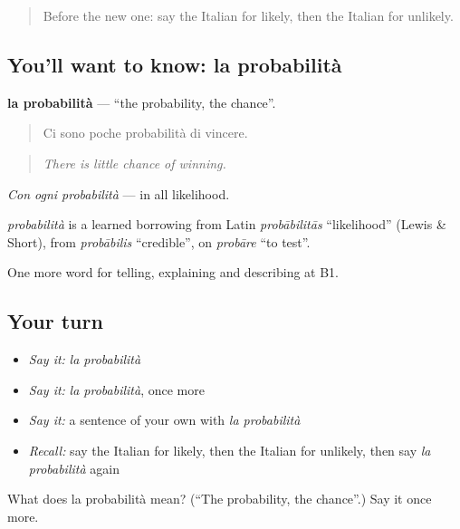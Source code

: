 \label{lesson:IT-C376-probabilita}



\begin{quote}
Before the new one: say the Italian for likely, then the Italian for unlikely.
\end{quote}

\subsection*{You'll want to know: la probabilità}
\textbf{la probabilità} — \textquotedblleft{}the probability, the chance\textquotedblright{}.

\begin{quote}
Ci sono poche probabilità di vincere.
\end{quote}

\begin{quote}
\emph{There is little chance of winning.}
\end{quote}

\emph{Con ogni probabilità} — in all likelihood.

\begin{cousinweb}
\emph{probabilità} is a learned borrowing from Latin \emph{probābilitās} \textquotedblleft{}likelihood\textquotedblright{} (Lewis \& Short), from \emph{probābilis} \textquotedblleft{}credible\textquotedblright{}, on \emph{probāre} \textquotedblleft{}to test\textquotedblright{}.
\end{cousinweb}

\begin{grammarlens}[title={What you've built}]
One more word for telling, explaining and describing at B1.
\end{grammarlens}

\subsection*{Your turn}
\begin{itemize}
\raggedright
  \item \emph{Say it:} \emph{la probabilità}
  \item \emph{Say it:} \emph{la probabilità}, once more
  \item \emph{Say it:} a sentence of your own with \emph{la probabilità}
  \item \emph{Recall:} say the Italian for likely, then the Italian for unlikely, then say \emph{la probabilità} again
\end{itemize}

\begin{tcolorbox}[breakable,colback=teal!4,colframe=teal!35!black,title={Before you move on}]
What does la probabilità mean? (\textquotedblleft{}The probability, the chance\textquotedblright{}.) Say it once more.
\end{tcolorbox}
